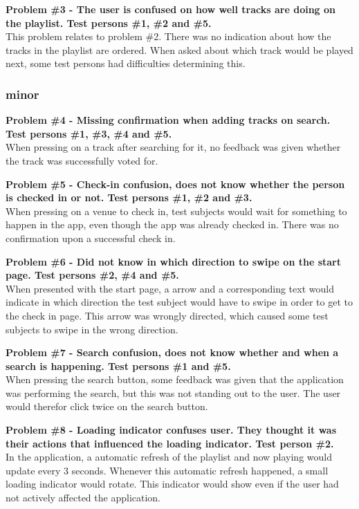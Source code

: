 \noindent\textbf{Problem \#3 - The user is confused on how well tracks are doing on the
    playlist. Test persons \#1, \#2 and \#5.}\\
  This problem relates to problem \#2. There was no indication about
  how the tracks in the playlist are ordered. When asked about which
  track would be played next, some test persons had difficulties
  determining this.

\subsubsection{minor}
\textbf{Problem \#4 - Missing confirmation when adding tracks on search. Test persons
    \#1, \#3, \#4 and \#5.}\\
  When pressing on a track after searching for it, no feedback was
  given whether the track was successfully voted for.

\noindent\textbf{Problem \#5 - Check-in confusion, does not know whether the person is checked
    in or not. Test persons \#1, \#2 and \#3.}\\
  When pressing on a venue to check in, test subjects would wait for
  something to happen in the app, even though the app was already
  checked in. There was no confirmation upon a successful check in.

\noindent\textbf{Problem \#6 - Did not know in which direction to swipe on the start page. Test
    persons \#2, \#4 and \#5.}\\
  When presented with the start page, a arrow and a corresponding text
  would indicate in which direction the test subject would have to
  swipe in order to get to the check in page. This arrow was wrongly
  directed, which caused some test subjects to swipe in the wrong direction.

\noindent\textbf{Problem \#7 - Search confusion, does not know whether and when a search is
    happening. Test persons \#1 and \#5.}\\
  When pressing the search button, some feedback was given that the
  application was performing the search, but this was not standing out
  to the user. The user would therefor click twice on the search button.

\noindent\textbf{Problem \#8 - Loading indicator confuses user. They thought it was their actions
    that influenced the loading indicator. Test person \#2.}\\
  In the application, a automatic refresh of the playlist and
  now playing would update every 3 seconds. Whenever this automatic
  refresh happened, a small loading indicator would rotate. This
  indicator would show even if the user had not actively affected the application.

